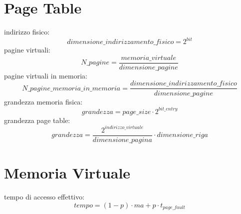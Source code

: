 \documentclass[a4paper,12pt, oneside]{book}
\begin{document}
\section{Page Table}
indirizzo fisico:
$$dimensione\_indirizzamento\_fisico=2^{bit}$$
pagine virtuali:
$$N\_pagine=\frac{memoria\_virtuale}{dimensione\_pagine}$$
pagine virtuali in memoria:
$$N\_pagine\_memoria\_in\_memoria=\frac{dimensione\_indirizzamento\_fisico}{dimensione\_pagine}$$
grandezza memoria fisica:
$$grandezza=page\_size\cdot 2^{bit\_entry}$$
grandezza page table:
$$grandezza=\frac{2^{indirizzo\_virtuale}}{dimensione\_pagina}\cdot dimensione\_riga$$
\section{Memoria Virtuale}
tempo di accesso effettivo:
$$tempo=(1-p)\cdot ma+p\cdot t_{page\_fault}$$
\end{document}
